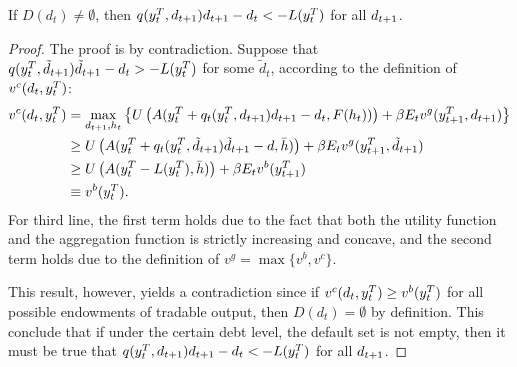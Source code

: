\begin{proposition}
    \label{prop1}
    If $D(d_t) \neq \emptyset$, then $q(y^T_{t}, d_{t+1})d_{t+1} - d_t < -L(y^T_{t})$ for all $d_{t+1}$.
\end{proposition}
\begin{proof}
    The proof is by contradiction. Suppose that $q(y^T_{t}, \tilde{d}_{t+1})\tilde{d}_{t+1} - d_t > -L(y^T_{t})$ for some $\tilde{d}_t$, according to the definition of $v^c(d_t, y^T_{t})$:
    \begin{align*}
        v^c(d_t, y^T_{t}) &= \max_{d_{t+1}, h_t} \left\{
            U\left( A(y^T_{t} + q_t(y^T_{t}, d_{t+1}) d_{t+1} - d_t, F(h_t)) \right) +
            \beta E_t v^g(y^T_{t+1}, d_{t+1})
         \right\}\\
         &\ge U\left( A(y^T_{t} + q_t(y^T_{t}, \tilde{d}_{t+1}) \tilde{d}_{t+1} - d, \bar{h}) \right) +
            \beta E_t v^g(y^T_{t+1}, \tilde{d}_{t+1}) \\
         &\ge U\left( A(y^T_{t} -L(y^T_{t}), \bar{h}) \right) +
            \beta E_t v^b(y^T_{t+1}) \\
        &\equiv v^b(y^T_{t}).
    \end{align*}
    For third line, the first term holds due to the fact that both the utility function and the aggregation function is strictly increasing and concave, and the second term holds due to the definition of  $v^g = \max\{v^b, v^c\}$.

    This result, however, yields a contradiction since if $v^c(d_t, y^T_{t}) \ge v^b(y^T_{t})$ for all possible endowments of tradable output, then $D(d_t) = \emptyset$ by definition. This conclude that if under the certain debt level, the default set is not empty, then it must be true that $q(y^T_{t}, d_{t+1})d_{t+1} - d_t < -L(y^T_{t})$ for all $d_{t+1}$.
\end{proof}

